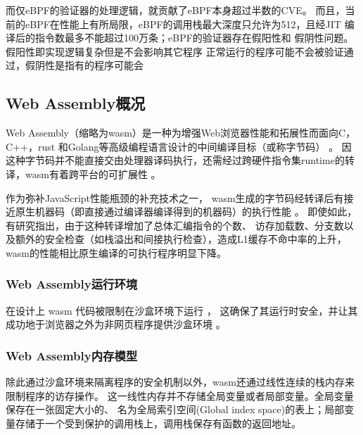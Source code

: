         而仅eBPF的验证器的处理逻辑，就贡献了eBPF本身超过半数的CVE\cite{hive}。
        而且，当前的eBPF在性能上有所局限，eBPF的调用栈最大深度只允许为512，且经JIT
        编译后的指令数最多不能超过100万条；eBPF的验证器存在假阳性\cite{hive}和
        假阴性问题\cite{RJXB202312023}。假阳性即实现逻辑复杂但是不会影响其它程序
        正常运行的程序可能不会被验证通过，假阴性是指有的程序可能会

\subsection{Web Assembly概况}
    Web Assembly（缩略为wasm）是一种为增强Web浏览器性能和拓展性而面向C，C++，rust
    和Golang等高级编程语言设计的中间编译目标（或称字节码）
    \cite{wasmCommunityGroup, lehmannWasabiFrameworkDynamically2019, 
        lehmannEverythingOldNew, bhansaliFirstLookCode2022, waseemIssuesTheirCauses2024}。
    因这种字节码并不能直接交由处理器译码执行，还需经过跨硬件指令集runtime的转译，wasm有着跨平台的可扩展性
    \cite{lehmannEverythingOldNew, waseemIssuesTheirCauses2024, 
        lehmannWasabiFrameworkDynamically2019, JayProvablySafe, 
        WebAssemblySummaryOnSecurity, rayOverviewWebAssemblyIoT2023}。

    作为弥补JavaScript性能瓶颈的补充技术之一\cite{rayOverviewWebAssemblyIoT2023}，
    wasm生成的字节码经转译后有接近原生机器码（即直接通过编译器编译得到的机器码）的执行性能
    \cite{haasBringingWebSpeed2017,johnsonWaVeVerifiablySecure2023}。
    即使如此，有研究\parencite{JangdaNotsoFast}指出，由于这种转译增加了总体汇编指令的个数、
    访存加载数、分支数以及额外的安全检查（如栈溢出和间接执行检查），造成L1缓存不命中率的上升，
    wasm的性能相比原生编译的可执行程序明显下降。

    \subsubsection{Web Assembly运行环境}
        在设计上 wasm 代码被限制在沙盒环境下运行
        \cite{johnsonWaVeVerifiablySecure2023,WasmbpfStreamliningEBPF2024}，
        这确保了其运行时安全，并让其成功地于浏览器之外为非网页程序提供沙盒环境
        \cite{narayanSwivelHardeningWebAssembly, WebAssemblySummaryOnSecurity, 9156135}。

    \subsubsection{Web Assembly内存模型}
        除此通过沙盒环境来隔离程序的安全机制以外，wasm还通过线性连续的栈内存来限制程序的访存操作。
        这一线性内存并不存储全局变量或者局部变量。全局变量保存在一张固定大小的、
        名为全局索引空间(Global index space)的表上；局部变量存储于一个受到保护的调用栈上，调用栈保存有函数的返回地址。

